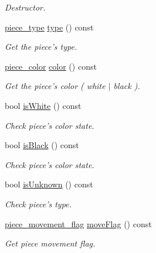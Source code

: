 \begin{DoxyCompactItemize}
\begin{DoxyCompactList}\small\item\em Destructor. \item\end{DoxyCompactList}\item 
\hyperlink{namespaceChEngn_a2a35c185f259757a78e937575b8ed483}{piece\_\-type} \hyperlink{classChEngn_1_1Piece_a65ab22bbe5b61fa699dfc83213d6744b}{type} () const 
\begin{DoxyCompactList}\small\item\em Get the piece's type. \item\end{DoxyCompactList}\item 
\hyperlink{namespaceChEngn_a9c81426c0134a97288a226c122daf62f}{piece\_\-color} \hyperlink{classChEngn_1_1Piece_a6c12383548443c206a6a874a90d5eb13}{color} () const 
\begin{DoxyCompactList}\small\item\em Get the piece's color ( white $|$ black ). \item\end{DoxyCompactList}\item 
bool \hyperlink{classChEngn_1_1Piece_a98920893afeab5395dba002ab3f88703}{isWhite} () const 
\begin{DoxyCompactList}\small\item\em Check piece's color state. \item\end{DoxyCompactList}\item 
bool \hyperlink{classChEngn_1_1Piece_a481b3d61628762f87d674fad3f858c3b}{isBlack} () const 
\begin{DoxyCompactList}\small\item\em Check piece's color state. \item\end{DoxyCompactList}\item 
bool \hyperlink{classChEngn_1_1Piece_a4105456968fa768a8d3673ce3c14eca3}{isUnknown} () const 
\begin{DoxyCompactList}\small\item\em Check piece's type. \item\end{DoxyCompactList}\item 
\hyperlink{namespaceChEngn_a491b2eba2f766087f4f28948005ab16a}{piece\_\-movement\_\-flag} \hyperlink{classChEngn_1_1Piece_a55d17737f8a56072f25ba00c6784ce85}{moveFlag} () const 
\begin{DoxyCompactList}\small\item\em Get piece movement flag. \item\end{DoxyCompactList}\item 

\end{DoxyCompactItemize}
